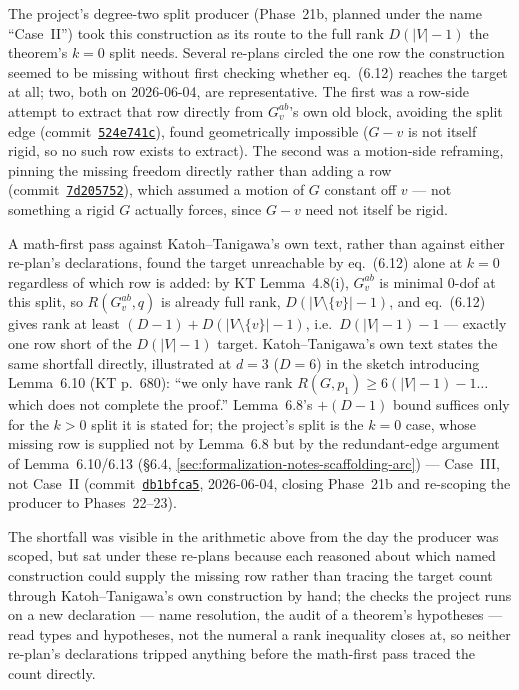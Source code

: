 The project's degree-two split producer (Phase~21b, planned under the name
``Case~II'') took this construction as its route to the full rank
$D(|V|-1)$ the theorem's $k=0$ split needs. Several re-plans circled the one
row the construction seemed to be missing without first checking whether
eq.~(6.12) reaches the target at all; two, both on 2026-06-04, are
representative. The first was a row-side attempt to extract that row
directly from $G_v^{ab}$'s own old block, avoiding the split edge
(commit~\href{https://github.com/bryangingechen/CombinatorialRigidity/commit/524e741c1d7bc9b8b4a51636527666af76136e1d}{\texttt{524e741c}}),
found geometrically impossible ($G - v$ is not itself rigid, so no such row
exists to extract). The second was a motion-side reframing, pinning the
missing freedom directly rather than adding a row
(commit~\href{https://github.com/bryangingechen/CombinatorialRigidity/commit/7d2057526237e0bafc0df62d4440411d6803f4ea}{\texttt{7d205752}}),
which assumed a motion of $G$ constant off $v$ --- not something a rigid $G$
actually forces, since $G - v$ need not itself be rigid.

A math-first pass against Katoh--Tanigawa's own text, rather than against
either re-plan's declarations, found the target unreachable by eq.~(6.12)
alone at $k=0$ regardless of which row is added: by KT Lemma~4.8(i),
$G_v^{ab}$ is minimal $0$-dof at this split, so $R(G_v^{ab}, q)$ is already
full rank, $D(|V \setminus \{v\}|-1)$, and eq.~(6.12) gives rank at least
$(D-1) + D(|V \setminus \{v\}|-1)$, i.e.\ $D(|V|-1) - 1$ --- exactly one row
short of the $D(|V|-1)$ target. Katoh--Tanigawa's own text states the same
shortfall directly, illustrated at $d=3$ ($D=6$) in the sketch introducing
Lemma~6.10 (KT p.~680): ``we only have rank $R(G,p_1) \ge 6(|V|-1)-1 \dots$
which does not complete the proof.'' Lemma~6.8's $+(D-1)$ bound suffices
only for the $k > 0$ split it is stated for; the project's split is the
$k=0$ case, whose missing row is supplied not by Lemma~6.8 but by the
redundant-edge argument of Lemma~6.10/6.13 (\S6.4,
\cref{sec:formalization-notes-scaffolding-arc}) --- Case~III, not Case~II
(commit~\href{https://github.com/bryangingechen/CombinatorialRigidity/commit/db1bfca589266fd6cbb209932337e41843d1fa72}{\texttt{db1bfca5}},
2026-06-04, closing Phase~21b and re-scoping the producer to
Phases~22--23).

The shortfall was visible in the arithmetic above from the day the
producer was scoped, but sat under these re-plans because each reasoned
about which named construction could supply the missing row rather than
tracing the target count through Katoh--Tanigawa's own construction by
hand; the checks the project runs on a new declaration --- name
resolution, the audit of a theorem's hypotheses --- read types and
hypotheses, not the numeral a rank inequality closes at, so neither
re-plan's declarations tripped anything before the math-first pass traced
the count directly.

